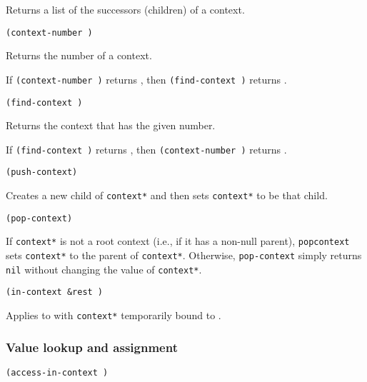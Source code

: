 Returns a list of the successors (children) of a context.

\begin{tabbing}
{\tt (context-number )} \MapsTo {}
\end{tabbing}

Returns the number of a context.

If {\tt (context-number )} returns , 
then {\tt (find-context )} returns .

\begin{tabbing}
{\tt (find-context )} \MapsTo {}
\end{tabbing}

Returns the context that has the given number.

If {\tt (find-context )} returns ,
then {\tt (context-number )} returns .

\begin{tabbing}
{\tt (push-context)} \MapsTo {}
\end{tabbing}

Creates a new child of {\tt *context*} and then sets {\tt *context*}
to be that child.

\begin{tabbing}
{\tt (pop-context)} \MapsTo {}
\end{tabbing}

If {\tt *context*} is not a root context (i.e., if it has a non-null
parent), {\tt popcontext} sets {\tt *context*} to the parent of
{\tt *context*}.  Otherwise, {\tt pop-context} simply returns {\tt nil}
without changing the value of {\tt *context*}.

\begin{tabbing}
{\tt (in-context   \&rest )}
     \MapsTo {}
\end{tabbing}

Applies  to  with {\tt *context*}
temporarily bound to .


\subsubsection{Value lookup and assignment}

\begin{tabbing}
{\tt (access-in-context  )} \MapsTo {}
\end{tabbing}

